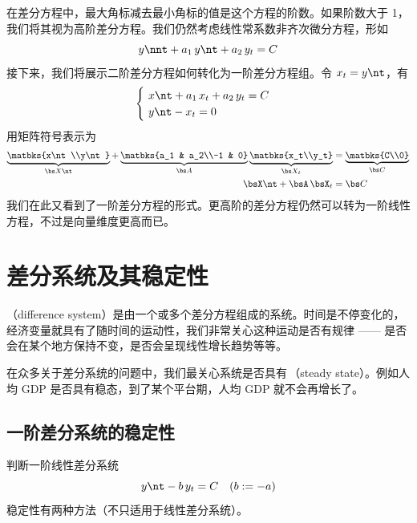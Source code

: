 在差分方程中，最大角标减去最小角标的值是这个方程的阶数。如果阶数大于 1，我们将其视为高阶差分方程。我们仍然考虑线性常系数非齐次微分方程，形如
\begin{equation}
    y\nnt + a_1\,y\nt + a_2\,y_t = C
\end{equation}
接下来，我们将展示二阶差分方程如何转化为一阶差分方程组。令 \(x_t=y\nt\)，有
\begin{equation}
    \begin{cases}
        \ x\nt + a_1\,x_t + a_2\,y_t = C\\
        \ y\nt - x_t = 0
    \end{cases}
\end{equation}
用矩阵符号表示为
\begin{align}
    \underbrace{\matbks{x\nt\\y\nt}}_{\bs X\nt}+\underbrace{\matbks{a_1 & a_2\\-1 & 0}}_{\bs A}\underbrace{\matbks{x_t\\y_t}}_{\bs X_t}&=\underbrace{\matbks{C\\0}}_{\bs C}\\
    \bsX\nt+\bsA\,\bsX_t&=\bs C\label{eq:DiffEquMatrix}
\end{align}
我们在此又看到了一阶差分方程的形式。更高阶的差分方程仍然可以转为一阶线性方程，不过是向量维度更高而已。

\section{差分系统及其稳定性}{\label{sec:DiffSysStable}}

（difference system）是由一个或多个差分方程组成的系统。时间是不停变化的，经济变量就具有了随时间的运动性，我们非常关心这种运动是否有规律 —— 是否会在某个地方保持不变，是否会呈现线性增长趋势等等。

在众多关于差分系统的问题中，我们最关心系统是否具有\,（steady state）。例如人均 GDP 是否具有稳态，到了某个平台期，人均 GDP 就不会再增长了。

\subsection{一阶差分系统的稳定性}{\label{subsec:FDiffSysStable}}

判断一阶线性差分系统
\begin{equation}
    y\nt - b\,y_t = C \quad (b:=-a)
\end{equation}
稳定性有两种方法（不只适用于线性差分系统）。


